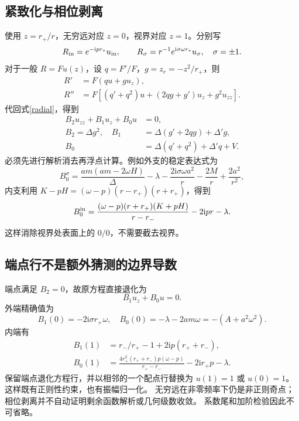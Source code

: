 \documentclass[UTF8,fontset=fandol,11pt,a4paper]{ctexart}
\newcommand{\ii}{\mathrm{i}}
\numberwithin{equation}{section}
\begin{document}
\subsection{紧致化与相位剥离}
使用 $z=r_+/r$，无穷远对应 $z=0$，视界对应 $z=1$。分别写
\begin{equation}
R_{\rm in}=e^{-\ii p r_*}u_{\rm in},\qquad
R_\sigma=r^{-1}e^{\ii\sigma\omega r_*}u_\sigma,\quad\sigma=\pm1.
\end{equation}
对于一般 $R=Fu(z)$，设 $q=F'/F$，$g=z_r=-z^2/r_+$，则
\begin{align}
R'&=F(qu+gu_z),\\
R''&=F[(q'+q^2)u+(2qg+g')u_z+g^2u_{zz}].
\end{align}
代回式\eqref{radial}，得到
\begin{align}
B_2u_{zz}+B_1u_z+B_0u&=0,\\
B_2=\Delta g^2,\quad B_1&=\Delta(g'+2qg)+\Delta'g,\\
B_0&=\Delta(q'+q^2)+\Delta'q+V.
\end{align}
必须先进行解析消去再浮点计算。例如外支的稳定表达式为
\begin{equation}
B_0^\sigma=\frac{am(am-2\omega H)}\Delta-\lambda
-\frac{2\ii\sigma\omega a^2}r-\frac{2M}r+\frac{2a^2}{r^2},
\end{equation}
内支利用 $K-pH=(\omega-p)(r-r_+)(r+r_+)$，得到
\begin{equation}
B_0^{\rm in}=\frac{(\omega-p)(r+r_+)(K+pH)}{r-r_-}-2\ii pr-\lambda.
\end{equation}
这样消除视界处表面上的 $0/0$，不需要截去视界。

\subsection{端点行不是额外猜测的边界导数}
端点满足 $B_2=0$，故原方程直接退化为
\begin{equation}B_1u_z+B_0u=0.\end{equation}
外端精确值为
\begin{equation}
B_1(0)=-2\ii\sigma r_+\omega,\quad
B_0(0)=-\lambda-2am\omega=-(A+a^2\omega^2).
\end{equation}
内端有
\begin{align}
B_1(1)&=r_-/r_+-1+2\ii p(r_++r_-),\\
B_0(1)&=\frac{4r_+^2(r_++r_-)p(\omega-p)}{r_+-r_-}-2\ii r_+p-\lambda.
\end{align}
保留端点退化方程行，并以相邻的一个配点行替换为 $u(1)=1$ 或 $u(0)=1$。
这样既有正则性约束，也有振幅归一化。
无穷远在非零频率下仍是非正则奇点；相位剥离并不自动证明剩余函数解析或几何级数收敛。
系数尾和加阶检验因此不可省略。
\end{document}

